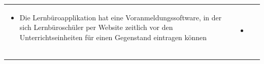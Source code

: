\begin{scriptsize}
\begin{tabularx}{\textwidth}{|l|X|X|}
{\begin{minipage}{.35\textwidth}
\begin{flushleft}
\begin{itemize}
         \item Die Lernbüroapplikation hat eine Voranmeldungssoftware, in der sich Lernbüroschüler per Website zeitlich vor den Unterrichtseinheiten für einen Gegenstand eintragen können
         \vspace{0.2cm}
    \end{itemize}
    \end{flushleft}
    \end{minipage}} & \multirow{3}{*}{
    \begin{minipage}{.50\textwidth} 
    \begin{flushleft}
        \begin{itemize} \vspace{-1.35cm}
         \item 
         \vspace{0.2cm}
    \end{itemize}
    \end{flushleft}
    \end{minipage}}\\
     & &  \\
     & &  \\
     & &  \\
     \hline
\end{tabularx}
\endgroup
\end{scriptsize}
\newpage

